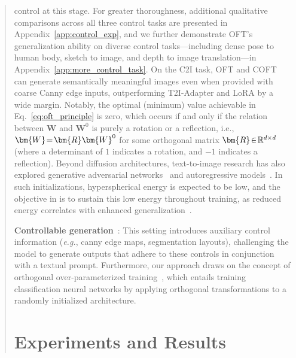 \begin{itemize}[leftmargin=*,nosep]
\begin{abstract}
control at this stage. For greater thoroughness, additional qualitative comparisons across all three control tasks are presented in Appendix~\ref{app:control_exp}, and we further demonstrate OFT’s generalization ability on diverse control tasks—including dense pose to human body, sketch to image, and depth to image translation—in Appendix~\ref{app:more_control_task}. On the C2I task, OFT and COFT can generate semantically meaningful images even when provided with coarse Canny edge inputs, outperforming T2I-Adapter and LoRA by a wide margin. Notably, the optimal (minimum) value achievable in Eq.~\eqref{eq:oft_principle} is zero, which occurs if and only if the relation between $\bm{W}$ and $\bm{W}^0$ is purely a rotation or a reflection, i.e., $\thickmuskip=2mu \medmuskip=2mu \bm{W}=\bm{R}\bm{W}^0$ for some orthogonal matrix $\thickmuskip=2mu \medmuskip=2mu \bm{R}\in\mathbb{R}^{d\times d}$ (where a determinant of $1$ indicates a rotation, and $-1$ indicates a reflection). Beyond diffusion architectures, text-to-image research has also explored generative adversarial networks~\cite{reed2016generative,zhang2017stackgan,xu2018attngan,li2019controllable} and autoregressive models~\cite{ramesh2021zero,ding2021cogview,wu2022nuwa,yuscaling}. In such initializations, hyperspherical energy is expected to be low, and the objective in \cite{liu2021orthogonal} is to sustain this low energy throughout training, as reduced energy correlates with enhanced generalization~\cite{liu2018learning,lin2020regularizing}. \item \textbf{Controllable generation}~\cite{zhang2023adding,mou2023t2i}: This setting introduces auxiliary control information (\emph{e.g.}, canny edge maps, segmentation layouts), challenging the model to generate outputs that adhere to these controls in conjunction with a textual prompt. Furthermore, our approach draws on the concept of orthogonal over-parameterized training~\cite{liu2021orthogonal}, which entails training classification neural networks by applying orthogonal transformations to a randomly initialized architecture. \section{Experiments and Results}


\end{abstract}
\end{itemize}
